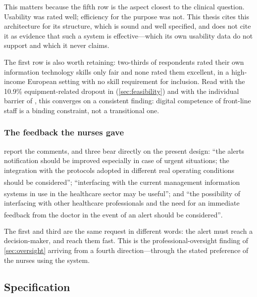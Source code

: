 \documentclass[12pt,a4paper,oneside]{report}
\newcommand{\bq}[1]{``#1''\textsuperscript{\dag}}
\begin{document}
This matters because the fifth row is the aspect closest to the clinical question. Usability was rated well; efficiency for the purpose was not. This thesis cites this architecture for its structure, which is sound and well specified, and does not cite it as evidence that such a system is effective---which its own usability data do not support and which it never claims.

The first row is also worth retaining: two-thirds of respondents rated their own information technology skills only fair and none rated them excellent, in a high-income European setting with no skill requirement for inclusion. Read with the 10.9\% equipment-related dropout in \textcite{mihevc2025} (\cref{sec:feasibility}) and with the individual barrier of \textcite{dodoo2022}, this converges on a consistent finding: digital competence of front-line staff is a binding constraint, not a transitional one.

\subsubsection{The feedback the nurses gave}

\Textcite{mucchi2021} report the comments, and three bear directly on the present design: \bq{the alerts notification should be improved especially in case of urgent situations; the integration with the protocols adopted in different real operating conditions should be considered}; \bq{interfacing with the current management information systems in use in the healthcare sector may be useful}; and \bq{the possibility of interfacing with other healthcare professionals and the need for an immediate feedback from the doctor in the event of an alert should be considered}.

The first and third are the same request in different words: the alert must reach a decision-maker, and reach them fast. This is the professional-oversight finding of \cref{sec:oversight} arriving from a fourth direction---through the stated preference of the nurses using the system.

\subsection{Specification}\label{sec:spec22}
\end{document}
